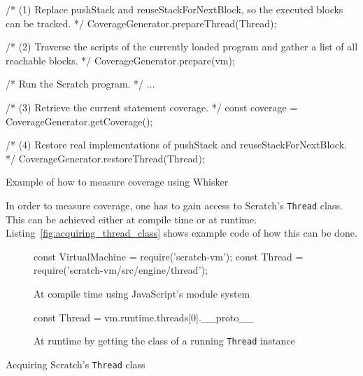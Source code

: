 \begin{listing}[htpb]
    \centering

    \begin{minipage}{.75\textwidth}
        \begin{javascriptcode}
            /* (1) Replace pushStack and reuseStackForNextBlock,
               so the executed blocks can be tracked. */
            CoverageGenerator.prepareThread(Thread);

            /* (2) Traverse the scripts of the currently loaded program
               and gather a list of all reachable blocks. */
            CoverageGenerator.prepare(vm);

            /* Run the Scratch program. */
            ...

            /* (3) Retrieve the current statement coverage. */
            const coverage = CoverageGenerator.getCoverage();

            /* (4) Restore real implementations of pushStack and
               reuseStackForNextBlock. */
            CoverageGenerator.restoreThread(Thread);
        \end{javascriptcode}
    \end{minipage}

    \caption{Example of how to measure coverage using Whisker}
    \label{fig:measuring_coverage}
\end{listing}

In order to measure coverage, one has to gain access to Scratch's \texttt{Thread} class.
This can be achieved either at compile time or at runtime.
Listing~\ref{fig:acquiring_thread_class} shows example code of how this can be done.
\parspace

\begin{listing}[htpb]
    \centering

    \begin{subfigure}[b]{.7\textwidth}
        \begin{javascriptcode}
            const VirtualMachine = require('scratch-vm');
            const Thread = require('scratch-vm/src/engine/thread');
        \end{javascriptcode}
        \vspace{-\bigskipamount}
        \caption{At compile time using JavaScript's module system}
    \end{subfigure}

    \bigskip

    \begin{subfigure}[b]{.7\textwidth}
        \begin{javascriptcode}
            const Thread = vm.runtime.threads[0].__proto__
        \end{javascriptcode}
        \vspace{-\bigskipamount}
        \caption{At runtime by getting the class of a running \texttt{Thread} instance}
    \end{subfigure}

    \caption{Acquiring Scratch's \texttt{Thread} class}
    \label{fig:acquiring_thread_class}
\end{listing}

